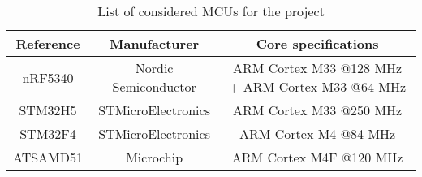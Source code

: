 \begin{table}[!hbt]
    \centering
    \begin{tabular}{| c || c | c |}
        \hline
        Reference & Manufacturer         & Core specifications                              \\
        \hline
        \hline
        nRF5340   & Nordic Semiconductor & ARM Cortex M33 @128 MHz + ARM Cortex M33 @64 MHz \\
        STM32H5   & STMicroElectronics   & ARM Cortex M33 @250 MHz                          \\
        STM32F4   & STMicroElectronics   & ARM Cortex M4 @84 MHz                            \\
        ATSAMD51  & Microchip            & ARM Cortex M4F @120 MHz                          \\
        \hline
    \end{tabular}
    \caption{List of considered MCUs for the project}
    \label{tab:mcu_list}
\end{table}
\FloatBarrier